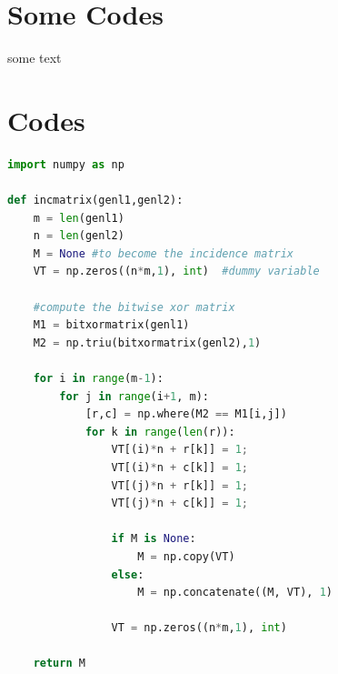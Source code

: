 \documentclass[a4paper,10pt,titlepage]{article}
\begin{document}
\begin{appendices}
\section{Some Codes}
some text
\section{Codes}

\begin{lstlisting}[language=Python]
import numpy as np
    
def incmatrix(genl1,genl2):
    m = len(genl1)
    n = len(genl2)
    M = None #to become the incidence matrix
    VT = np.zeros((n*m,1), int)  #dummy variable
    
    #compute the bitwise xor matrix
    M1 = bitxormatrix(genl1)
    M2 = np.triu(bitxormatrix(genl2),1) 

    for i in range(m-1):
        for j in range(i+1, m):
            [r,c] = np.where(M2 == M1[i,j])
            for k in range(len(r)):
                VT[(i)*n + r[k]] = 1;
                VT[(i)*n + c[k]] = 1;
                VT[(j)*n + r[k]] = 1;
                VT[(j)*n + c[k]] = 1;
                
                if M is None:
                    M = np.copy(VT)
                else:
                    M = np.concatenate((M, VT), 1)
                
                VT = np.zeros((n*m,1), int)
    
    return M
\end{lstlisting}
\end{appendices}

\end{document}
